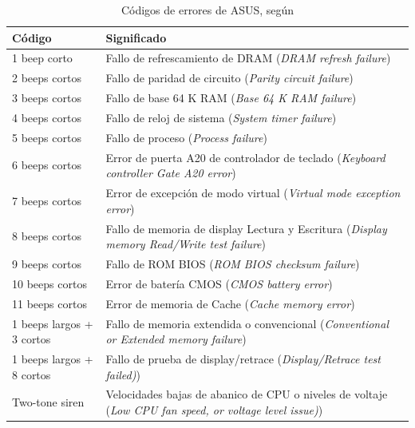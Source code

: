 \documentclass[stu, 12pt, letterpaper, donotrepeattitle, floatsintext, natbib, helv]{apa7}
\begin{document}
\begin{table} [H]
    \centering
    \begin{tabular}{|p{4cm} | p{11cm}|}
        \hline
        Código & Significado \\
        \hline\hline
        1 beep corto & Fallo de refrescamiento de DRAM (\textit{DRAM refresh failure}) \\
        \hline
        2 beeps cortos & Fallo de paridad de circuito (\textit{Parity circuit failure}) \\
        \hline 
        3 beeps cortos & Fallo de base 64 K RAM (\textit{Base 64 K RAM failure}) \\
        \hline
        4 beeps cortos & Fallo de reloj de sistema (\textit{System timer failure}) \\
        \hline
        5 beeps cortos & Fallo de proceso (\textit{Process failure}) \\
        \hline
        6 beeps cortos & Error de puerta A20 de controlador de teclado (\textit{Keyboard controller Gate A20 error}) \\ 
        \hline
        7 beeps cortos & Error de excepción de modo virtual (\textit{Virtual mode exception error}) \\
        \hline
        8 beeps cortos & Fallo de memoria de display Lectura y Escritura (\textit{Display memory Read/Write test failure}) \\
        \hline
        9 beeps cortos & Fallo de ROM BIOS (\textit{ROM BIOS checksum failure}) \\
        \hline
        10 beeps cortos & Error de batería CMOS (\textit{CMOS battery error}) \\
        \hline
        11 beeps cortos & Error de memoria de Cache (\textit{Cache memory error}) \\
        \hline
        1 beeps largos + 3 cortos & Fallo de memoria extendida o convencional (\textit{Conventional or Extended memory failure}) \\
        \hline
        1 beeps largos + 8 cortos & Fallo de prueba de display/retrace (\textit{Display/Retrace test failed)}) \\
        \hline
        Two-tone siren & Velocidades bajas de abanico de CPU o niveles de voltaje (\textit{Low CPU fan speed, or voltage level issue)}) \\
        \hline
    \end{tabular}
    \caption{Códigos de errores de ASUS, según \cite{ErrorCodes}}
    \label{tab:errorsTable}
\end{table}
\end{document}
